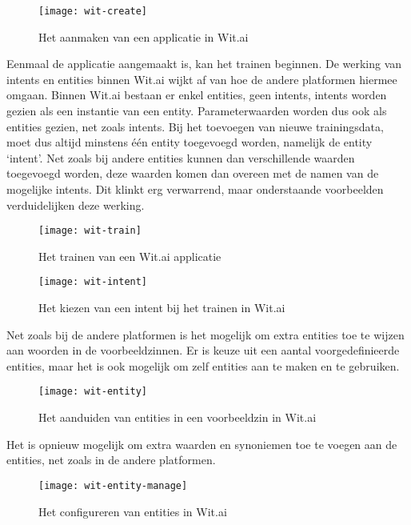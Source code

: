\begin{figure}[H]
    \label{fig:wit-create}
    \centering
    \texttt{[image: wit-create]}
    \caption{Het aanmaken van een applicatie in Wit.ai}
\end{figure}

Eenmaal de applicatie aangemaakt is, kan het trainen beginnen. De werking van intents en entities binnen Wit.ai wijkt af van hoe de andere platformen hiermee omgaan. Binnen Wit.ai bestaan er enkel entities, geen intents, intents worden gezien als een instantie van een entity. Parameterwaarden worden dus ook als entities gezien, net zoals intents. Bij het toevoegen van nieuwe trainingsdata, moet dus altijd minstens één entity toegevoegd worden, namelijk de entity ‘intent’. Net zoals bij andere entities kunnen dan verschillende waarden toegevoegd worden, deze waarden komen dan overeen met de namen van de mogelijke intents. Dit klinkt erg verwarrend, maar onderstaande voorbeelden verduidelijken deze werking.

\begin{figure}[H]
    \label{fig:wit-train}
    \centering
    \texttt{[image: wit-train]}
    \caption{Het trainen van een Wit.ai applicatie}
\end{figure}

\begin{figure}[H]
    \label{fig:wit-intent}
    \centering
    \texttt{[image: wit-intent]}
    \caption{Het kiezen van een intent bij het trainen in Wit.ai}
\end{figure}

Net zoals bij de andere platformen is het mogelijk om extra entities toe te wijzen aan woorden in de voorbeeldzinnen. Er is keuze uit een aantal voorgedefinieerde entities, maar het is ook mogelijk om zelf entities aan te maken en te gebruiken.

\begin{figure}[H]
    \label{fig:wit-entity}
    \centering
    \texttt{[image: wit-entity]}
    \caption{Het aanduiden van entities in een voorbeeldzin in Wit.ai}
\end{figure}

Het is opnieuw mogelijk om extra waarden en synoniemen toe te voegen aan de entities, net zoals in de andere platformen.

\begin{figure}[H]
    \label{fig:wit-intent-manage}
    \centering
    \texttt{[image: wit-entity-manage]}
    \caption{Het configureren van entities in Wit.ai}
\end{figure}

